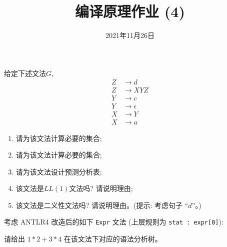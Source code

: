 \documentclass[a4paper, justified]{tufte-handout}
\title{编译原理作业 (4)}
\date{2021年11月26日}
\begin{document}
\maketitle
\noplagiarism %
\begin{abstract}
\end{abstract}
\beginrequired

\begin{problem}[\score{10 = 3 + 3 + 2 + 1 + 1}]
  给定下述文法$G$,
  \begin{align}
    Z &\to d \\[8pt]
    Z &\to XYZ \\[8pt]
    Y &\to c \\[8pt]
    Y &\to \epsilon \\[8pt]
    X &\to Y \\[8pt]
    X &\to a
  \end{align}

  \begin{enumerate}[(1)]
    \item 请为该文法计算必要的\first{}集合;
    \item 请为该文法计算必要的\follow{}集合;
    \item 请为该文法设计预测分析表;
    \item 该文法是$LL(1)$文法吗? 请说明理由;
    \item 该文法是二义性文法吗? 请说明理由。({提示: 考虑句子 ``$d$''}。)
  \end{enumerate}
\end{problem}

\begin{solution}
\end{solution}

\pagebreak
\begin{problem}[\score{10}]
  考虑 ANTLR4 改造后的如下 \texttt{Expr} 文法
  (上层规则为 \texttt{stat : expr[0]}):


  \noindent 请给出 $1 \ast 2 + 3 \ast 4$ 在该文法下对应的语法分析树。
\end{problem}
\end{document}
